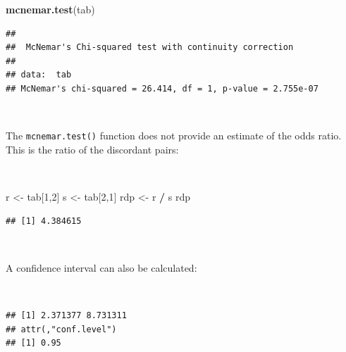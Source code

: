 \documentclass[12pt,a4paper]{book}
\newenvironment{Shaded}{\begin{snugshade}}{\end{snugshade}}
\newcommand{\KeywordTok}[1]{\textcolor[rgb]{0.13,0.29,0.53}{\textbf{#1}}}
\newcommand{\DecValTok}[1]{\textcolor[rgb]{0.00,0.00,0.81}{#1}}
\newcommand{\StringTok}[1]{\textcolor[rgb]{0.31,0.60,0.02}{#1}}
\newcommand{\OperatorTok}[1]{\textcolor[rgb]{0.81,0.36,0.00}{\textbf{#1}}}
\newcommand{\NormalTok}[1]{#1}
\theoremstyle{definition}
\theoremstyle{definition}
\theoremstyle{definition}
\theoremstyle{remark}
\begin{document}
\begin{Shaded}
\begin{Highlighting}[]
\KeywordTok{mcnemar.test}\NormalTok{(tab)}
\end{Highlighting}
\end{Shaded}

\begin{verbatim}
## 
##  McNemar's Chi-squared test with continuity correction
## 
## data:  tab
## McNemar's chi-squared = 26.414, df = 1, p-value = 2.755e-07
\end{verbatim}

~

The \texttt{mcnemar.test()} function does not provide an estimate of the
odds ratio. This is the ratio of the discordant pairs:

~

\begin{Shaded}
\begin{Highlighting}[]
\NormalTok{r <-}\StringTok{ }\NormalTok{tab[}\DecValTok{1}\NormalTok{,}\DecValTok{2}\NormalTok{]}
\NormalTok{s <-}\StringTok{ }\NormalTok{tab[}\DecValTok{2}\NormalTok{,}\DecValTok{1}\NormalTok{]}
\NormalTok{rdp <-}\StringTok{ }\NormalTok{r }\OperatorTok{/}\StringTok{ }\NormalTok{s}
\NormalTok{rdp}
\end{Highlighting}
\end{Shaded}

\begin{verbatim}
## [1] 4.384615
\end{verbatim}

~

A confidence interval can also be calculated:

~

\begin{Shaded}
\end{Shaded}

\begin{verbatim}
## [1] 2.371377 8.731311
## attr(,"conf.level")
## [1] 0.95
\end{verbatim}

~
\end{document}

